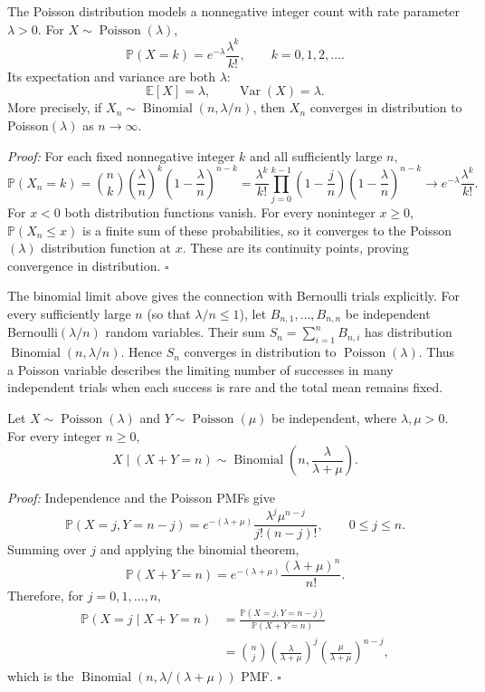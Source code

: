 \documentclass[a4paper,11pt,abstracton]{scrartcl}
\theoremstyle{dotlessP}
\theoremstyle{dotlessS}
\theoremstyle{remark}
\theoremstyle{definition}
\begin{document}
The Poisson distribution models a nonnegative integer count with rate parameter $\lambda>0$. For $X\sim\operatorname{Poisson}(\lambda)$,
\[
  \mathbb{P}(X=k)=e^{-\lambda}\frac{\lambda^k}{k!},
  \qquad k=0,1,2,\ldots.
\]
Its expectation and variance are both $\lambda$:
\[
  \mathbb{E}[X]=\lambda,\qquad \operatorname{Var}(X)=\lambda.
\]
More precisely, if $X_n\sim\operatorname{Binomial}(n,\lambda/n)$, then $X_n$ converges in distribution to Poisson$(\lambda)$ as $n\to\infty$.
\begin{claim_box}
\textit{Proof:} For each fixed nonnegative integer $k$ and all sufficiently large $n$,
\[
  \mathbb{P}(X_n=k)
  =\binom{n}{k}\left(\frac{\lambda}{n}\right)^k
    \left(1-\frac{\lambda}{n}\right)^{n-k}
  =\frac{\lambda^k}{k!}\prod_{j=0}^{k-1}\left(1-\frac{j}{n}\right)
    \left(1-\frac{\lambda}{n}\right)^{n-k}
  \longrightarrow e^{-\lambda}\frac{\lambda^k}{k!}.
\]
For $x<0$ both distribution functions vanish. For every noninteger $x\geq0$, $\mathbb{P}(X_n\leq x)$ is a finite sum of these probabilities, so it converges to the Poisson$(\lambda)$ distribution function at $x$. These are its continuity points, proving convergence in distribution.
\hfill$\square$
\end{claim_box}

The binomial limit above gives the connection with Bernoulli trials explicitly. For every sufficiently large $n$ (so that $\lambda/n\leq1$), let $B_{n,1},\ldots,B_{n,n}$ be independent Bernoulli$(\lambda/n)$ random variables. Their sum $S_n=\sum_{i=1}^n B_{n,i}$ has distribution $\operatorname{Binomial}(n,\lambda/n)$. Hence $S_n$ converges in distribution to $\operatorname{Poisson}(\lambda)$. Thus a Poisson variable describes the limiting number of successes in many independent trials when each success is rare and the total mean remains fixed.

\begin{problem_box}
Let $X\sim\operatorname{Poisson}(\lambda)$ and $Y\sim\operatorname{Poisson}(\mu)$ be independent, where $\lambda,\mu>0$. For every integer $n\geq0$,
\[
  X\mid(X+Y=n)\sim
  \operatorname{Binomial}\!\left(n,\frac{\lambda}{\lambda+\mu}\right).
\]
\end{problem_box}

\begin{claim_box}
\textit{Proof:} Independence and the Poisson PMFs give
\[
  \mathbb{P}(X=j,Y=n-j)
  =e^{-(\lambda+\mu)}
    \frac{\lambda^j\mu^{n-j}}{j!(n-j)!},
  \qquad 0\leq j\leq n.
\]
Summing over $j$ and applying the binomial theorem,
\[
  \mathbb{P}(X+Y=n)
  =e^{-(\lambda+\mu)}\frac{(\lambda+\mu)^n}{n!}.
\]
Therefore, for $j=0,1,\ldots,n$,
\[
\begin{aligned}
  \mathbb{P}(X=j\mid X+Y=n)
  &=\frac{\mathbb{P}(X=j,Y=n-j)}{\mathbb{P}(X+Y=n)}\\
  &=\binom{n}{j}
    \left(\frac{\lambda}{\lambda+\mu}\right)^j
    \left(\frac{\mu}{\lambda+\mu}\right)^{n-j},
\end{aligned}
\]
which is the $\operatorname{Binomial}(n,\lambda/(\lambda+\mu))$ PMF.
\hfill$\square$
\end{claim_box}
\end{document}
